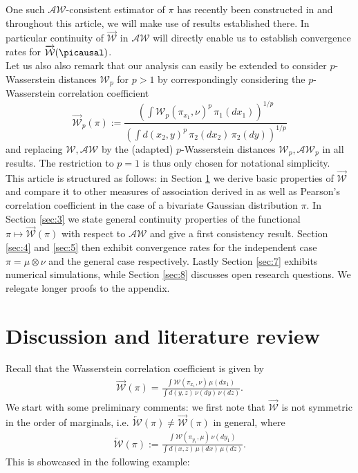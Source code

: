 \documentclass[10pt]{amsart}
\begin{document}
One such $\mathcal{AW}$-consistent estimator of $\pi$ has recently been constructed in \cite{backhoff2020estimating} and throughout this article, we will make use of results established there. In particular continuity of $\overrightarrow{\mathcal{W}}$ in $\mathcal{AW}$ will directly enable us to establish convergence rates for $\overrightarrow{\mathcal{W}}(\picausal)$.\\

Let us also also remark that our analysis can easily be extended to consider $p$-Wasserstein distances $\mathcal{W}_p$ for $p>1$ by correspondingly considering the $p$-Wasserstein correlation coefficient
$$ \overrightarrow{\mathcal{W}}_p(\pi):=\frac{\left(\int \mathcal{W}_p(\pi_{x_1},\nu)^p\,\pi_1(dx_1)\right)^{1/p}}{\left(\int  d(x_2,y)^p\,\pi_2(dx_2)\,\pi_2(dy)\right)^{1/p}}$$
and replacing $\mathcal{W}, \mathcal{AW}$ by the (adapted) $p$-Wasserstein distances $\mathcal{W}_p, \mathcal{AW}_p$ in all results. The restriction to $p=1$ is thus only chosen for notational simplicity.\\

This article is structured as follows: in Section \ref{sec:2} we derive basic properties of $\overrightarrow{\mathcal{W}}$ and compare it to other measures of association derived in \cite{chatterjee2020new, deb2020kernel} as well as Pearson's correlation coefficient in the case of a bivariate Gaussian distribution $\pi$. In Section \ref{sec:3} we state general continuity properties of the functional $\pi\mapsto \overrightarrow{\mathcal{W}}(\pi)$ with respect to $\mathcal{AW}$ and give a first consistency result. Section \ref{sec:4} and \ref{sec:5} then exhibit convergence rates for the independent case $\pi=\mu\otimes \nu$ and the general case respectively. Lastly Section \ref{sec:7} exhibits numerical simulations, while Section \ref{sec:8} discusses open research questions. We relegate longer proofs to the appendix.

\section{Discussion and literature review}\label{sec:2}

Recall that the Wasserstein correlation coefficient is given by
\begin{align*}
\overrightarrow{\mathcal{W}}(\pi)=\frac{\int \mathcal{W}(\pi_{x_1},\nu)\,\mu(dx_1)}{\int  d(y,z)\,\nu(dy)\,\nu(dz)}.
\end{align*}
We start with some preliminary comments: we first note that $\overrightarrow{\mathcal{W}}$ is not symmetric in the order of marginals, i.e. $ \overleftarrow{\mathcal{W}}(\pi)\neq \overrightarrow{\mathcal{W}}(\pi)$ in general, where
\begin{align*}
\overleftarrow{\mathcal{W}}(\pi):=\frac{\int \mathcal{W}(\pi_{y_1},\mu)\,\nu(dy_1)}{\int  d(x,z)\,\mu(dx)\,\mu(dz)}.
\end{align*}
This is showcased in the following example:
\end{document}

